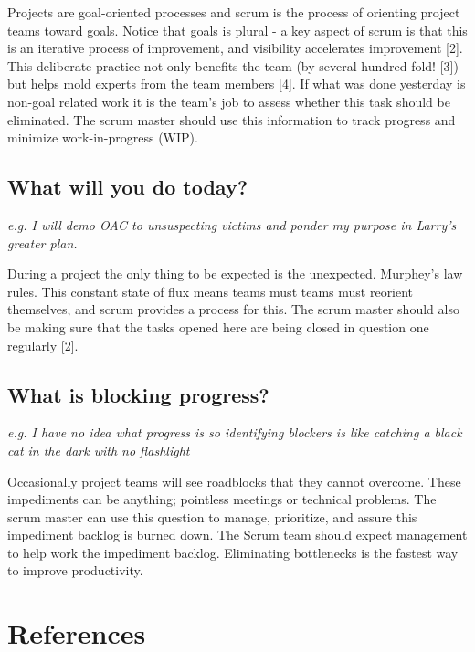 \documentclass{article}
\begin{document}
Projects are goal-oriented processes and scrum is the process of orienting project teams toward goals. Notice that goals is plural -
a key aspect of scrum is that this is an iterative process of improvement, and visibility accelerates improvement [2]. This deliberate practice not only benefits the team (by several hundred fold! [3]) but helps mold experts from the team members [4]. If what was done yesterday is non-goal related work it is the team's job to assess whether this task should be eliminated. The scrum master should use this information to track progress and minimize work-in-progress (WIP). 

\vspace{5cm}


\subsection{What will you do today?}
\textit{e.g. I will demo OAC to unsuspecting victims and ponder my purpose in Larry's greater plan.}
\newline 

During a project the only thing to be expected is the unexpected. Murphey's law rules. 
This constant state of flux means teams must teams must reorient themselves, and scrum provides a process for this. 
The scrum master should also be making sure that the tasks opened here are being closed in question one regularly [2].

\vspace{6.5cm}

\subsection{What is blocking progress?}
\textit{e.g. I have no idea what progress is so identifying blockers is like catching a black cat in the dark with no flashlight}
\newline

Occasionally project teams will see roadblocks that they cannot overcome. These impediments can be anything; pointless meetings or technical problems. 
The scrum master can use this question to manage, prioritize, and assure this impediment backlog is burned down. 
The Scrum team should expect management to help work the impediment backlog. Eliminating bottlenecks is the fastest way to improve productivity.

\vspace{6.5cm}

\section{References}
\end{document}
